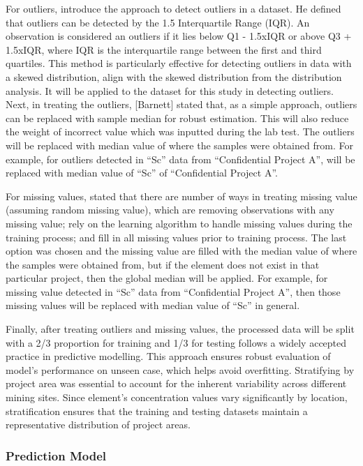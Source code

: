 \documentclass[11pt,a4paper,]{article}
\begin{document}
For outliers, \textcite{tukey1977} introduce the approach to detect outliers in a dataset. He defined that outliers can be detected by the 1.5 Interquartile Range (IQR). An observation is considered an outliers if it lies below Q1 - 1.5xIQR or above Q3 + 1.5xIQR, where IQR is the interquartile range between the first and third quartiles. This method is particularly effective for detecting outliers in data with a skewed distribution, align with the skewed distribution from the distribution analysis. It will be applied to the dataset for this study in detecting outliers. Next, in treating the outliers, {[}Barnett{]} stated that, as a simple approach, outliers can be replaced with sample median for robust estimation. This will also reduce the weight of incorrect value which was inputted during the lab test. The outliers will be replaced with median value of where the samples were obtained from. For example, for outliers detected in ``Sc'' data from ``Confidential Project A'', will be replaced with median value of ``Sc'' of ``Confidential Project A''.

For missing values, \textcite{Hastie09} stated that there are number of ways in treating missing value (assuming random missing value), which are removing observations with any missing value; rely on the learning algorithm to handle missing values during the training process; and fill in all missing values prior to training process. The last option was chosen and the missing value are filled with the median value of where the samples were obtained from, but if the element does not exist in that particular project, then the global median will be applied. For example, for missing value detected in ``Sc'' data from ``Confidential Project A'', then those missing values will be replaced with median value of ``Sc'' in general.

Finally, after treating outliers and missing values, the processed data will be split with a 2/3 proportion for training and 1/3 for testing follows a widely accepted practice in predictive modelling. This approach ensures robust evaluation of model's performance on unseen case, which helps avoid overfitting. Stratifying by project area was essential to account for the inherent variability across different mining sites. Since element's concentration values vary significantly by location, stratification ensures that the training and testing datasets maintain a representative distribution of project areas.

\subsubsection{Prediction Model}\label{prediction-model}
\end{document}
